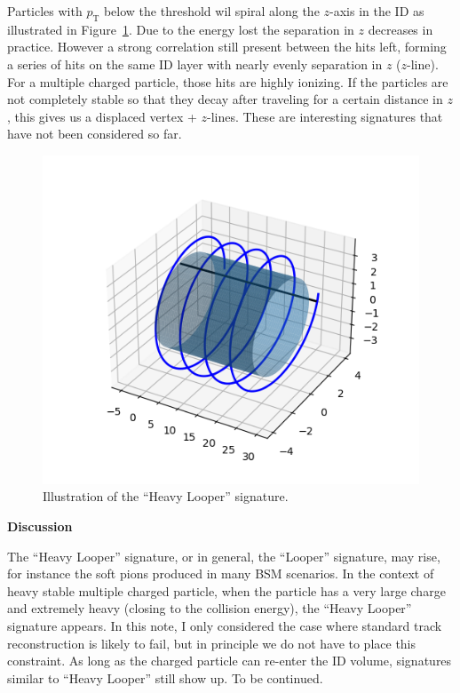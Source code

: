 \documentclass[10pt,letterpaper]{article}
\begin{document}
Particles with $p_{\mathrm{T}}$ below the threshold wil spiral along the
$z$-axis in the ID as illustrated in Figure~\ref{fig:looper}. Due to the
energy lost the separation in $z$ decreases in practice. However a strong
correlation still present between the hits left, forming a series of hits on
the same ID layer with nearly evenly separation in $z$ ($z$-line). For a
multiple charged particle, those hits are highly ionizing. If the particles are
not completely stable so that they decay after traveling for a certain distance
in $z$, this gives us a displaced vertex + $z$-lines. These are interesting
signatures that have not been considered so far.\\ 

\begin{figure}[!thb]
   \centering
   \includegraphics[scale=0.5]{spiralCartoon.png}
   \caption{Illustration of the ``Heavy Looper'' signature.}
   \label{fig:looper}
\end{figure}

\textbf{Discussion}

The ``Heavy Looper'' signature, or in general, the ``Looper'' signature, may
rise, for instance the soft pions produced in many BSM scenarios. In the
context of heavy stable multiple charged particle, when the particle has a very
large charge and extremely heavy (closing to the collision energy), the ``Heavy
Looper'' signature appears. In this note, I only considered the case where
standard track reconstruction is likely to fail, but in principle we do not
have to place this constraint. As long as the charged particle can re-enter the
ID volume, signatures similar to ``Heavy Looper'' still show up. To be
continued.
\end{document}
